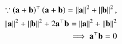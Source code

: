 	\begin{align}
\because 		\brak{\vec{a}+\vec{b}}^{\top}\brak{\vec{a}+\vec{b}} 
		= \norm{\vec{a}}^2+\norm{\vec{b}}^2,
		\\
		 \norm{\vec{a}}^2+\norm{\vec{b}}^2+2\vec{a}^{\top}\vec{b}
		= \norm{\vec{a}}^2+\norm{\vec{b}}^2
		\\
		\implies 
		\vec{a}^{\top}\vec{b} = 0 
	\end{align}

